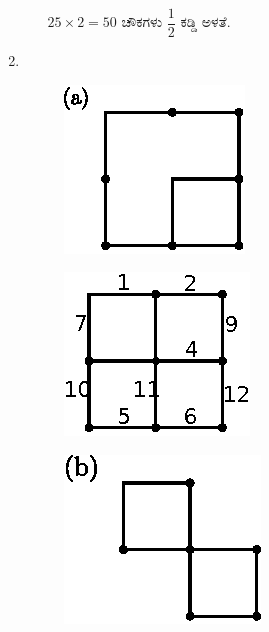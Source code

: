 \begin{enumerate}
\begin{itemize}
\begin{minipage}[c]{4cm}
$25\times 2 = 50$ ಚೌಕಗಳು $\dfrac{1}{2}$ ಕಡ್ಡಿ ಅಳತೆ. 
\end{minipage}
\end{itemize}

\eject

\item 
~

\begin{minipage}[c]{4cm}
\begin{figure}[H]
\centering
\includegraphics{images/chap7/ans12.eps}

\end{figure}
\end{minipage}
\begin{minipage}[c]{5cm}
\begin{figure}[H]
\centering
\includegraphics{images/chap7/ans12a.eps}

\end{figure}
\end{minipage}


\begin{minipage}[c]{4cm}
\begin{figure}[H]
\centering
\includegraphics{images/chap7/ans12b.eps}


\end{figure}
\end{minipage}
\end{enumerate}
